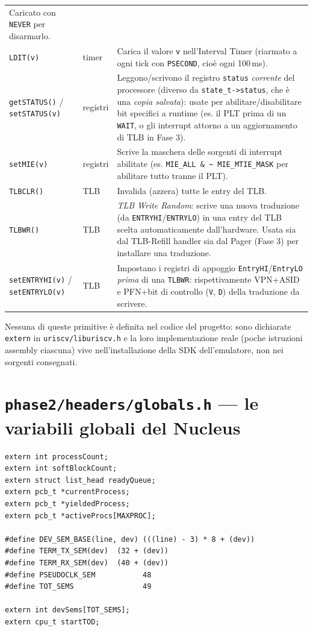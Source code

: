\documentclass[11pt,a4paper]{article}
\newcommand{\code}[1]{\texttt{#1}}
\begin{document}
\begin{center}
\begin{longtable}{@{}llp{7.8cm}@{}}
  Caricato con \code{NEVER} per disarmarlo. \\
\code{LDIT(v)} & timer & Carica il valore \code{v} nell'Interval Timer
  (riarmato a ogni tick con \code{PSECOND}, cioè ogni 100\,ms). \\
\code{getSTATUS()} / \code{setSTATUS(v)} & registri & Leggono/scrivono il
  registro \code{status} \emph{corrente} del processore (diverso da
  \code{state\_t->status}, che è una \emph{copia salvata}): usate per
  abilitare/disabilitare bit specifici a runtime (es. il PLT prima di un
  \code{WAIT}, o gli interrupt attorno a un aggiornamento di TLB in Fase
  3). \\
\code{setMIE(v)} & registri & Scrive la maschera delle sorgenti di
  interrupt abilitate (es. \code{MIE\_ALL \& \textasciitilde
  MIE\_MTIE\_MASK} per abilitare tutto tranne il PLT). \\
\code{TLBCLR()} & TLB & Invalida (azzera) tutte le entry del TLB. \\
\code{TLBWR()} & TLB & \emph{TLB Write Random}: scrive una nuova
  traduzione (da \code{ENTRYHI}/\code{ENTRYLO}) in una entry del TLB
  scelta automaticamente dall'hardware. Usata sia dal TLB-Refill handler
  sia dal Pager (Fase 3) per installare una traduzione. \\
\code{setENTRYHI(v)} / \code{setENTRYLO(v)} & TLB & Impostano i registri
  di appoggio \code{EntryHI}/\code{EntryLO} \emph{prima} di una
  \code{TLBWR}: rispettivamente VPN+ASID e PFN+bit di controllo
  (\code{V}, \code{D}) della traduzione da scrivere. \\
\bottomrule
\end{longtable}
\end{center}
Nessuna di queste primitive è definita nel codice del progetto: sono
dichiarate \code{extern} in \code{uriscv/liburiscv.h} e la loro
implementazione reale (poche istruzioni assembly ciascuna) vive
nell'installazione della SDK dell'emulatore, non nei sorgenti consegnati.

\section{\code{phase2/headers/globals.h} --- le variabili globali del Nucleus}

\begin{lstlisting}
extern int processCount;
extern int softBlockCount;
extern struct list_head readyQueue;
extern pcb_t *currentProcess;
extern pcb_t *yieldedProcess;
extern pcb_t *activeProcs[MAXPROC];

#define DEV_SEM_BASE(line, dev) (((line) - 3) * 8 + (dev))
#define TERM_TX_SEM(dev)  (32 + (dev))
#define TERM_RX_SEM(dev)  (40 + (dev))
#define PSEUDOCLK_SEM           48
#define TOT_SEMS                49

extern int devSems[TOT_SEMS];
extern cpu_t startTOD;
\end{lstlisting}
\end{document}
